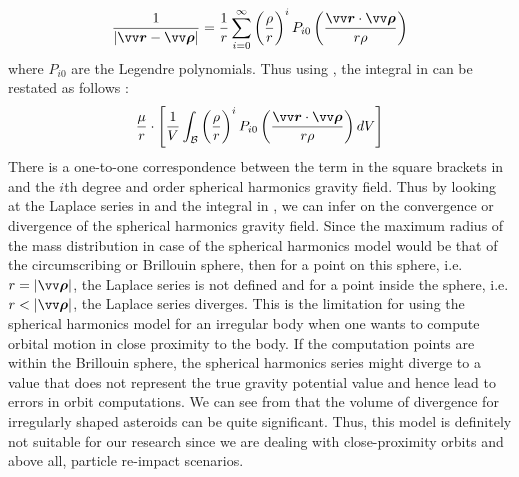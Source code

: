 \begin{align}
    \frac{1}{|\bvector{r} - \bvector{\rho}|} = \frac{1}{r} \sum_{i=0}^{\infty} \left(\frac{\rho}{r}\right)^i P_{i0} \left(\frac{\bvector{r} \cdot \bvector{\rho}}{r\rho}\right)
    \label{eqn:general_grav_term_laplace_series}
\end{align}
where $P_{i0}$ are the Legendre polynomials. Thus using , the integral in  can be restated as follows \parencite{scheeresBook}:
\begin{align}
    \frac{\mu}{r} \cdot \left[ \frac{1}{V} \int_{\mathcal{B}} \left(\frac{\rho}{r}\right)^i P_{i0} \left(\frac{\bvector{r} \cdot \bvector{\rho}}{r\rho}\right) dV \right]
    \label{eqn:general_gravity_field_modified_integral}
\end{align}
There is a one-to-one correspondence between the term in the square brackets in  and the $i$th degree and order spherical harmonics gravity field. Thus by looking at the Laplace series in  and the integral in , we can infer on the convergence or divergence of the spherical harmonics gravity field. Since the maximum radius of the mass distribution in case of the spherical harmonics model would be that of the circumscribing or Brillouin sphere, then for a point on this sphere, i.e. $r = |\bvector{\rho}|$, the Laplace series is not defined and for a point inside the sphere, i.e. $r < |\bvector{\rho}|$, the Laplace series diverges. This is the limitation for using the spherical harmonics model for an irregular body when one wants to compute orbital motion in close proximity to the body. If the computation points are within the Brillouin sphere, the spherical harmonics series might diverge to a value that does not represent the true gravity potential value and hence lead to errors in orbit computations. We can see from  that the volume of divergence for irregularly shaped asteroids can be quite significant. Thus, this model is definitely not suitable for our research since we are dealing with close-proximity orbits and above all, particle re-impact scenarios.
